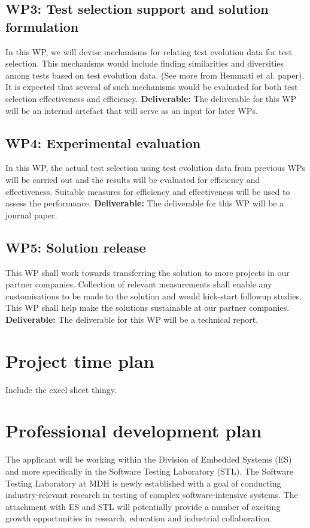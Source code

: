 \documentclass[11pt, oneside]{article}   	%
\begin{document}
\subsection{WP3: Test selection support and solution formulation}\label{sec:WP3}
In this WP, we will devise mechanisms  for relating test evolution data for test selection. This mechanisms would include finding similarities and diversities among tests based on test evolution data. (See more from Hemmati et al. paper). It is expected that several of such mechanisms would be evaluated for both test selection effectiveness and efficiency. \textbf{Deliverable:} The deliverable for this WP will be an internal artefact that will serve as an input for later WPs.

\subsection{WP4: Experimental evaluation}\label{sec:WP4}
In this WP, the actual test selection using test evolution data from previous WPs will be carried out and the results will be evaluated for efficiency and effectiveness. Suitable measures for efficiency and effectiveness will be used to assess the performance. \textbf{Deliverable:} The deliverable for this WP will be a journal paper.

\subsection{WP5: Solution release}\label{sec:WP5}
This WP shall work towards transferring the solution to more projects in our partner companies. Collection of relevant measurements shall enable any customisations to be made to the solution and would kick-start followup studies. This WP shall help make the solutions sustainable at our partner companies. \textbf{Deliverable:} The deliverable for this WP will be a technical report.

\section{Project time plan}\label{sec:proj_time_plan}
Include the excel sheet thingy.

\section{Professional development plan}\label{sec:prof_dev_plan}
The applicant will be working within the Division of Embedded Systems (ES) and more specifically in the Software Testing Laboratory (STL). The Software Testing Laboratory at MDH is newly established with a goal of conducting industry-relevant research in testing of complex software-intensive systems. The attachment with ES and STL will potentially provide a number of exciting growth opportunities in research, education and industrial collaboration. 
\end{document}
